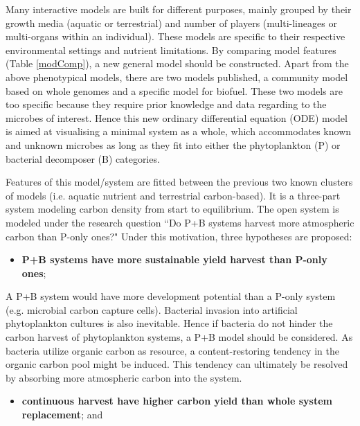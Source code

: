 \documentclass[../thesis.tex]{subfiles} %
\begin{document}
Many interactive models are built for different purposes, mainly grouped by their growth media (aquatic or terrestrial) and number of players (multi-lineages or multi-organs within an individual).  These models are specific to their respective environmental settings and nutrient limitations.  By comparing model features (Table \ref{modComp}), a new general model should be constructed.  Apart from the above phenotypical models, there are two models published, a community model based on whole genomes\autocite{harcombe2014metabolic} and a specific model for biofuel\autocite{kirthiga2014mathematical}.  These two models are too specific because they require prior knowledge and data regarding to the microbes of interest.  Hence this new ordinary differential equation (ODE) model is aimed at visualising a minimal system as a whole, which accommodates known and unknown microbes as long as they fit into either the phytoplankton (P) or bacterial decomposer (B) categories.

Features of this model/system are fitted between the previous two known clusters of models (i.e. aquatic nutrient and terrestrial carbon-based).  It is a three-part system modeling carbon density from start to equilibrium.  The open system is modeled under the research question ``Do P+B systems harvest more atmospheric carbon than P-only ones?"
Under this motivation, three hypotheses are proposed:
\begin{itemize}
    \item \textbf{P+B systems have more sustainable yield harvest than P-only ones};
\end{itemize}

A P+B system would have more development potential than a P-only system (e.g. microbial carbon capture cells).  Bacterial invasion into artificial phytoplankton cultures is also inevitable.  Hence if bacteria do not hinder the carbon harvest of phytoplankton systems, a P+B model should be considered.  As bacteria utilize organic carbon as resource, a content-restoring tendency in the organic carbon pool might be induced.  This tendency can ultimately be resolved by absorbing more atmospheric carbon into the system.

\begin{itemize}
    \item \textbf{continuous harvest have higher carbon yield than whole system replacement}; and
\end{itemize}
\end{document}
